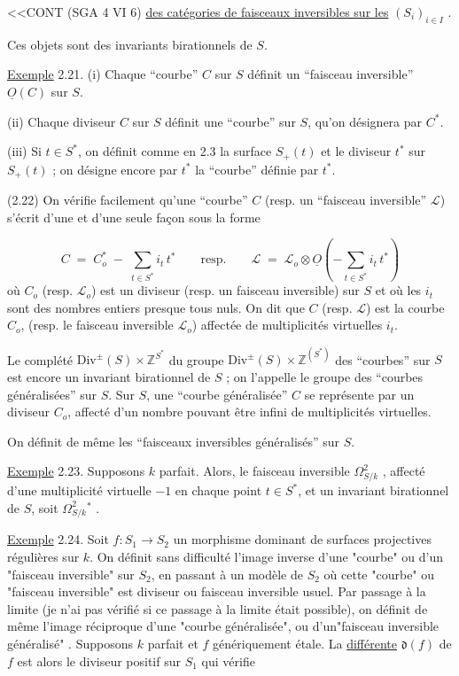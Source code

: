 
<<CONT (SGA 4 VI 6) \underline{des catégories de faisceaux inversibles sur les} $(S_i)_{i \in I}$ .

Ces objets sont des invariants birationnels de $S$.

\underline{Exemple} 2.21. (i) Chaque ``courbe'' $C$ sur $S$ définit un ``faisceau inversible'' $\underline{O}(C)$ sur $S$.

(ii) Chaque diviseur $C$ sur $S$ définit une ``courbe'' sur $S$, qu'on désignera par $C^*$.

(iii) Si $t \in S^*$, on définit comme en 2.3 la surface $S_+(t)$ et le diviseur $t^*$ sur $S_+(t)$ ; on désigne encore par $t^*$ la ``courbe'' définie par $t^*$.

(2.22) On vérifie facilement qu'une ``courbe'' $C$ (resp. un ``faisceau inversible'' $\mathcal{L}$) s'écrit d'une et d'une seule façon sous la forme

\begin{equation*}
C \;=\; C_o^* \;-\; \sum_{t \in S^*} i_t \, t^* \qquad \text{resp.} \qquad \mathcal{L} \;=\; \mathcal{L}_o \otimes \underline{O} \left( -\sum_{t \in S^*} i_t \, t^* \right)
\end{equation*}
où $C_o$ (resp. $\mathcal{L}_o$) est un diviseur (resp. un faisceau inversible) sur $S$ et où les $i_t$ sont des nombres entiers presque tous nuls. On dit que $C$ (resp. $\mathcal{L}$) est la courbe $C_o$, (resp. le faisceau inversible $\mathcal{L}_o$) affectée de multiplicités virtuelles $i_t$.

Le complété $\mathrm{Div}^{\pm} (S) \times \mathbb{Z}^{S^*}$ du groupe $\mathrm{Div}^{\pm} (S) \times \mathbb{Z}^{(S^*)}$ des ``courbes'' sur $S$ est encore un invariant birationnel de $S$ ; on l'appelle le groupe des ``courbes généralisées'' sur $S$. Sur $S$, une ``courbe généralisée'' $C$ se représente par un diviseur $C_o$, affecté d'un nombre pouvant être infini de multiplicités virtuelles.

On définit de même les ``faisceaux inversibles généralisés'' sur $S$.



\underline{Exemple} 2.23. Supposons $k$ parfait. Alors, le faisceau inversible $\Omega^2_{S/k}$ , affecté d'une multiplicité virtuelle $-1$ en chaque point $t \in S^*$, et un invariant birationnel de $S$, soit $\Omega^2_{S/k}{}^*$ .

\underline{Exemple} 2.24.  Soit $f : S_1 \longrightarrow S_2$ un morphisme dominant de surfaces projectives régulières sur $k$. On définit sans difficulté l'image inverse d'une "courbe" ou d'un "faisceau inversible" sur $S_2$, en passant à un modèle de $S_2$ où cette "courbe" ou "faisceau inversible" est diviseur ou faisceau inversible usuel. Par passage à la limite (je n'ai pas vérifié si ce passage à la limite était possible), on définit de même l'image réciproque d'une "courbe généralisée", ou d'un"faisceau inversible généralisé" . Supposons $k$ parfait et $f$ génériquement étale. La \underline{différente} $\mathfrak{d}(f)$ de $f$ est alors le diviseur positif sur $S_1$ qui vérifie

